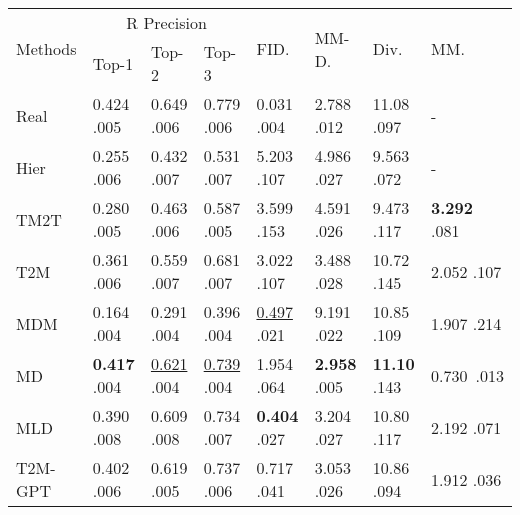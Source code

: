 \documentclass[10pt,twocolumn,letterpaper]{article}
\begin{document}
\begin{table*}[ht]

\begin{center}
\begin{tabular}{p{2.15cm}p{1.70cm}p{1.70cm}p{1.70cm}p{1.70cm}p{1.70cm}p{1.70cm}p{1.70cm}}
\hline
\multirow{2}{*}{Methods}&\multicolumn{3}{c}{R Precision}& \multirow{2}{*}{FID.}&\multirow{2}{*}{MM-D.}& \multirow{2}{*}{Div.}& \multirow{2}{*}{MM.}\\ \cline{2-4}
&Top-1&Top-2&Top-3&&&&\\
\hline

 Real& 0.424 \tiny  .005& 0.649  \tiny  .006& 0.779  \tiny  .006& 0.031  \tiny  .004&2.788  \tiny  .012 &11.08 \tiny  .097 &-\\
 \hline

Hier~\cite{ghosh2021synthesis} & 0.255 \tiny  .006& 0.432  \tiny  .007& 0.531  \tiny  .007& 5.203  \tiny  .107&4.986 \tiny  .027 &9.563 \tiny  .072 &-\\

TM2T~\cite{guo2022tm2t} & 0.280 \tiny  .005& 0.463  \tiny  .006& 0.587 \tiny  .005& 3.599  \tiny  .153&4.591  \tiny  .026 &9.473 \tiny  .117 &\textbf{3.292} \tiny  .081\\

T2M~\cite{guo2022generating} & 0.361 \tiny  .006& 0.559  \tiny  .007& 0.681 \tiny  .007& 3.022 \tiny  .107&3.488  \tiny  .028 &10.72 \tiny  .145 &2.052 \tiny  .107\\

MDM~\cite{tevet2023human} & 0.164 \tiny  .004& 0.291  \tiny  .004& 0.396  \tiny  .004& \underline{0.497}  \tiny  .021&9.191 \tiny  .022 &10.85 \tiny  .109 &1.907 \tiny  .214\\

MD~\cite{zhang2022motiondiffuse} & \textbf{0.417} \tiny  .004& \underline{0.621}  \tiny  .004& \underline{0.739}  \tiny  .004& 1.954 \tiny  .064&\textbf{2.958} \tiny  .005 &\textbf{11.10} \tiny  .143 & 0.730\tiny \  .013\\

MLD~\cite{chen2023mld} & 0.390 \tiny  .008& 0.609 \tiny  .008& 0.734  \tiny  .007& \textbf{0.404}  \tiny  .027&3.204  \tiny  .027&10.80 \tiny  .117 &2.192 \tiny  .071\\

T2M-GPT~\cite{zhang2023t2m}& 0.402 \tiny  .006& 0.619  \tiny  .005& 0.737  \tiny  .006& 0.717 \tiny  .041&3.053  \tiny  .026 &10.86 \tiny  .094 &1.912 \tiny  .036\\


\end{tabular}
\end{center}
\end{table*}
\end{document}
